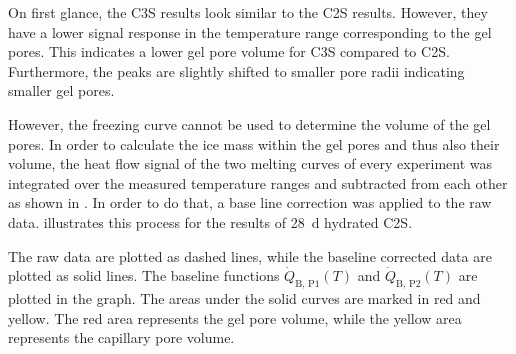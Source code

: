 On first glance, the \ac{C3S} results look similar to the \ac{C2S} results.
However, they have a lower signal response in the temperature range corresponding to the gel pores.
This indicates a lower gel pore volume for \ac{C3S} compared to \ac{C2S}.
Furthermore, the peaks are slightly shifted to smaller pore radii indicating smaller gel pores.

However, the freezing curve cannot be used to determine the volume of the gel pores.
In order to calculate the ice mass within the gel pores and thus also their volume, the heat flow signal of the two melting curves of every experiment was integrated over the measured temperature ranges and subtracted from each other as shown in .
In order to do that, a base line correction was applied to the raw data.
 illustrates this process for the results of \qty{28}{\day} hydrated \ac{C2S}.

The raw data are plotted as dashed lines, while the baseline corrected data are plotted as solid lines.
The baseline functions $\dot{Q}_\text{B, P1}(T)$ and $\dot{Q}_\text{B, P2}(T)$ are plotted in the graph.
The areas under the solid curves are marked in red and yellow.
The red area represents the gel pore volume, while the yellow area represents the capillary pore volume.

